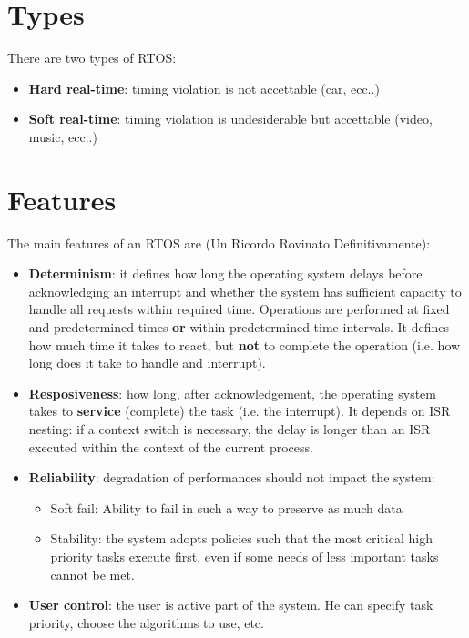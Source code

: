 \section{Types}
There are two types of RTOS:
\begin{itemize}
	\item \textbf{Hard real-time}: timing violation is not accettable (car, ecc..)
	\item \textbf{Soft real-time}: timing violation is undesiderable but accettable (video, music, ecc..)
\end{itemize}

\section{Features}
The main features of an RTOS are (Un Ricordo Rovinato Definitivamente):
\begin{itemize}
	\item \textbf{Determinism}: it defines how long the operating system delays before acknowledging an interrupt and whether the system has sufficient capacity to handle all requests within required time. Operations are performed at fixed and predetermined times \textbf{or} within predetermined time intervals. It defines how much time it takes to react, but \textbf{not} to complete the operation (i.e. how long does it take to handle and interrupt). 
	\item \textbf{Resposiveness}: how long, after acknowledgement, the operating system takes to \textbf{service} (complete) the task (i.e. the interrupt). It depends on ISR nesting: if a context switch is necessary, the delay is longer than an ISR executed within the context of the current process.
	\item \textbf{Reliability}: degradation of performances should not impact the system:	
	\begin{itemize}
		\item Soft fail: Ability to fail in such a way to preserve as much data
		\item Stability: the system adopts policies such that the most critical high priority tasks execute first, even if some needs of less important tasks cannot be met.
	\end{itemize}
	\item \textbf{User control}: the user is active part of the system. He can specify task priority, choose the algorithms to use, etc.
\end{itemize}




